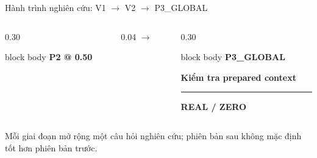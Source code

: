 \documentclass[aspectratio=169,11pt]{beamer}
\begin{document}
\begin{frame}{Hành trình nghiên cứu: V1 $\rightarrow$ V2 $\rightarrow$ P3\_GLOBAL}
\begin{columns}[T,onlytextwidth]
\begin{column}{0.30\textwidth}
\begin{beamercolorbox}[rounded=true,sep=0.45em,center]{block body}
        \vspace{0.15em}\textbf{\footnotesize P2 @ 0.50}\par
      \end{beamercolorbox}
    \end{column}
    \begin{column}{0.04\textwidth}
      \vspace{4.2em}\centering\color{TimelyTeal}$\rightarrow$
    \end{column}
    \begin{column}{0.30\textwidth}
      \begin{beamercolorbox}[rounded=true,sep=0.45em,center]{block body}
        {\Large\bfseries\color{TimelyBlue}P3\_GLOBAL}\par
        \vspace{0.15em}\textbf{\small Kiểm tra prepared context}\par
        \par
        \vspace{0.3em}\rule{0.8\linewidth}{0.4pt}\par
        \par
        \vspace{0.15em}\textbf{\footnotesize REAL / ZERO}\par
        \vspace{0.3em}{\scriptsize Lợi ích chất lượng / độ trễ\par chưa ổn định}
      \end{beamercolorbox}
    \end{column}
  \end{columns}
  \vfill
  \centering\footnotesize\color{TimelyGray}
  Mỗi giai đoạn mở rộng một câu hỏi nghiên cứu; phiên bản sau không mặc định tốt hơn phiên bản trước.
\end{frame}
\end{document}
